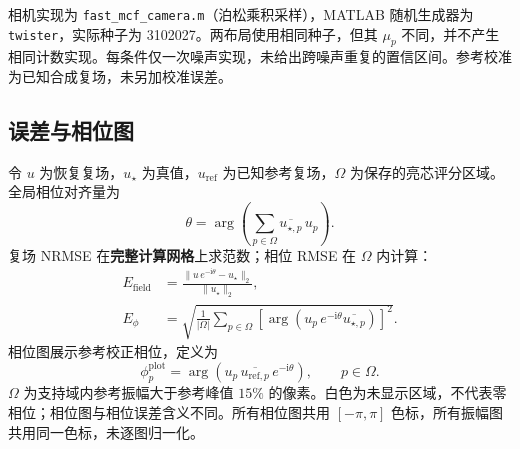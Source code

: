 \documentclass[UTF8,a4paper,11pt,fontset=fandol]{ctexart}
\begin{document}
相机实现为 \texttt{fast\_mcf\_camera.m}（泊松乘积采样），MATLAB 随机生成器为 \texttt{twister}，实际种子为 3102027。两布局使用相同种子，但其 $\mu_p$ 不同，并不产生相同计数实现。每条件仅一次噪声实现，未给出跨噪声重复的置信区间。参考校准为已知合成复场，未另加校准误差。
\subsection*{误差与相位图}
令 $u$ 为恢复复场，$u_\star$ 为真值，$u_{\mathrm{ref}}$ 为已知参考复场，$\Omega$ 为保存的亮芯评分区域。全局相位对齐量为
\begin{equation}
\theta=\arg\!\left(\sum_{p\in\Omega}\overline{u_{\star,p}}\,u_p\right).
\end{equation}
复场 NRMSE 在\textbf{完整计算网格}上求范数；相位 RMSE 在 $\Omega$ 内计算：
\begin{align}
E_{\mathrm{field}}&=\frac{\lVert u\,e^{-\mathrm{i}\theta}-u_\star\rVert_2}{\lVert u_\star\rVert_2},\\
E_\phi&=\sqrt{\frac{1}{|\Omega|}\sum_{p\in\Omega}
\left[\arg\!\left(u_p\,e^{-\mathrm{i}\theta}\overline{u_{\star,p}}\right)\right]^2}.
\end{align}
相位图展示参考校正相位，定义为
\begin{equation}
\phi_p^{\mathrm{plot}}=\arg\!\left(u_p\,\overline{u_{\mathrm{ref},p}}\,e^{-\mathrm{i}\theta}\right),\qquad p\in\Omega.
\label{eq:phaseplot}
\end{equation}
$\Omega$ 为支持域内参考振幅大于参考峰值 $15\%$ 的像素。白色为未显示区域，不代表零相位；相位图与相位误差含义不同。所有相位图共用 $[-\pi,\pi]$ 色标，所有振幅图共用同一色标，未逐图归一化。
\end{document}
